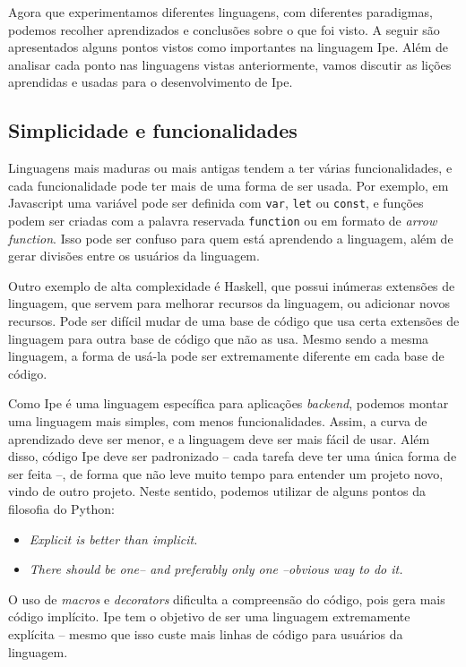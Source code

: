 Agora que experimentamos diferentes linguagens, com diferentes paradigmas, podemos
recolher aprendizados e conclusões sobre o que foi visto. A seguir são apresentados
alguns pontos vistos como importantes na linguagem Ipe. Além de analisar cada ponto
nas linguagens vistas anteriormente, vamos discutir as lições aprendidas e usadas
para o desenvolvimento de Ipe.

\subsection{Simplicidade e funcionalidades}

Linguagens mais maduras ou mais antigas tendem a ter várias funcionalidades, e
cada funcionalidade pode ter mais de uma forma de ser usada. Por exemplo, em
Javascript uma variável pode ser definida com \texttt{var}, \texttt{let} ou
\texttt{const}, e funções podem ser criadas com a palavra reservada \texttt{function}
ou em formato de \textit{arrow function}. Isso pode ser confuso para quem está
aprendendo a linguagem, além de gerar divisões entre os usuários da linguagem.

Outro exemplo de alta complexidade é Haskell, que possui inúmeras extensões de
linguagem, que servem para melhorar recursos da linguagem, ou adicionar novos
recursos. Pode ser difícil mudar de uma base de código que usa certa extensões
de linguagem para outra base de código que não as usa. Mesmo sendo a mesma linguagem,
a forma de usá-la pode ser extremamente diferente em cada base de código.

Como Ipe é uma linguagem específica para aplicações \textit{backend}, podemos
montar uma linguagem mais simples, com menos funcionalidades. Assim, a curva de
aprendizado deve ser menor, e a linguagem deve ser mais fácil de usar. Além disso,
código Ipe deve ser padronizado -- cada tarefa deve ter uma única forma de ser feita --,
de forma que não leve muito tempo para entender um projeto novo, vindo de outro projeto.
Neste sentido, podemos utilizar de alguns pontos da filosofia do Python:

\begin{itemize}
  \item \textit{Explicit is better than implicit.}
  \item \textit{There should be one-- and preferably only one --obvious way to do it.}
\end{itemize}

\cite{zenofpython}

O uso de \textit{macros} e \textit{decorators} dificulta a compreensão do código,
pois gera mais código implícito. Ipe tem o objetivo de ser uma linguagem extremamente
explícita -- mesmo que isso custe mais linhas de código para usuários da linguagem.

